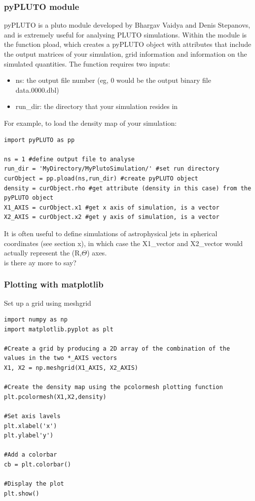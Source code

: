 \documentclass[12pt]{article}
\begin{document}
\subsubsection{pyPLUTO module}
pyPLUTO is a pluto module developed by Bhargav Vaidya and Denis Stepanovs, and is extremely useful for analysing PLUTO simulations. Within the module is the function pload, which creates a pyPLUTO object with attributes that include the output matrices of your simulation, grid information and information on the simulated quantities. The function requires two inputs:
\begin{itemize}
\item ns: the output file number (eg, 0 would be the output binary file data.0000.dbl)
\item run\_dir: the directory that your simulation resides in
\end{itemize}
For example, to load the density map of your simulation:
\begin{lstlisting}
import pyPLUTO as pp

ns = 1 #define output file to analyse
run_dir = 'MyDirectory/MyPlutoSimulation/' #set run directory
curObject = pp.pload(ns,run_dir) #create pyPLUTO object
density = curObject.rho #get attribute (density in this case) from the pyPLUTO object
X1_AXIS = curObject.x1 #get x axis of simulation, is a vector
X2_AXIS = curObject.x2 #get y axis of simulation, is a vector
\end{lstlisting}
It is often useful to define simulations of astrophysical jets in spherical coordinates (see section x), in which case the X1\_vector and X2\_vector would actually represent the (R,$\Theta$) axes.\\
is there ay more to say?

\subsubsection{Plotting with matplotlib}

Set up a grid using meshgrid
\begin{lstlisting}
import numpy as np
import matplotlib.pyplot as plt

#Create a grid by producing a 2D array of the combination of the values in the two *_AXIS vectors
X1, X2 = np.meshgrid(X1_AXIS, X2_AXIS)

#Create the density map using the pcolormesh plotting function 
plt.pcolormesh(X1,X2,density)

#Set axis lavels
plt.xlabel('x')
plt.ylabel'y')

#Add a colorbar
cb = plt.colorbar()

#Display the plot
plt.show()
\end{lstlisting}
\end{document}
